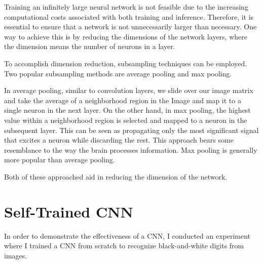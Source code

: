 Training an infinitely large neural network is not feasible due to the increasing computational costs associated with both training and inference.
Therefore, it is essential to ensure that a network is not unnecessarily larger than necessary.
One way to achieve this is by reducing the dimensions of the network layers, where the dimension means the number of neurons in a layer.

To accomplish dimension reduction, subsampling techniques can be employed. Two popular subsampling methods are average pooling and max pooling.

In average pooling, similar to convolution layers, we slide over our image matrix and take the average of a neighborhood region in the Image and map it to a single neuron in the next layer.
On the other hand, in max pooling, the highest value within a neighborhood region is selected and mapped to a neuron in the subsequent layer.
This can be seen as propagating only the most significant signal that excites a neuron while discarding the rest. This approach bears some resemblance to the way the brain processes information.
Max pooling is generally more popular than average pooling.

Both of these approached aid in reducing the dimension of the network.

\section{Self-Trained CNN}

In order to demonstrate the effectiveness of a CNN, I conducted an experiment where I trained a CNN from scratch to recognize black-and-white digits from images.

